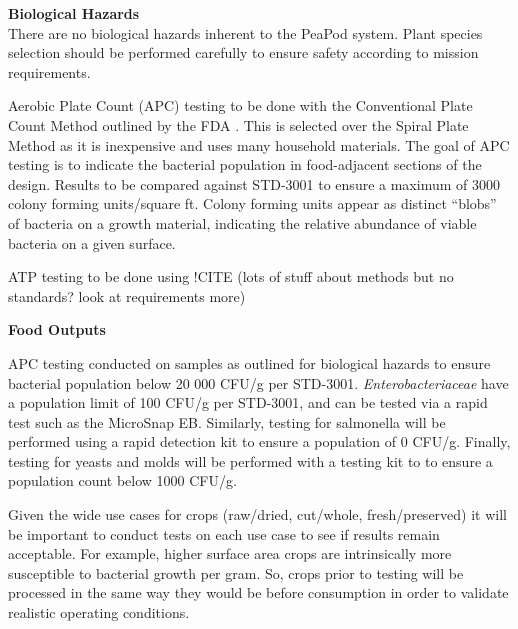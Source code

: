 
\textbf{Biological Hazards}\\
There are no biological hazards inherent to the PeaPod system. Plant species selection should be performed carefully to ensure safety according to mission requirements.

Aerobic Plate Count (APC) testing to be done with the Conventional Plate Count Method outlined by the FDA \cite{platecount}. This is selected over the Spiral Plate Method as it is inexpensive and uses many household materials. The goal of APC testing is to indicate the bacterial population in food-adjacent sections of the design. Results to be compared against STD-3001 to ensure a maximum of 3000 colony forming units/square ft. Colony forming units appear as distinct ``blobs'' of bacteria on a growth material, indicating the relative abundance of viable bacteria on a given surface.

ATP testing to be done using !CITE (lots of stuff about methods but no standards? look at requirements more)

\textbf{Food Outputs}

APC testing conducted on samples as outlined for biological hazards to ensure bacterial population below 20 000 CFU/g per STD-3001. \textit{Enterobacteriaceae} have a population limit of 100 CFU/g per STD-3001, and can be tested via a rapid test such as the MicroSnap EB. Similarly, testing for salmonella will be performed using a rapid detection kit to ensure a population of 0 CFU/g. Finally, testing for yeasts and molds will be performed with a testing kit to to ensure a population count below 1000 CFU/g.

Given the wide use cases for crops (raw/dried, cut/whole, fresh/preserved) it will be important to conduct tests on each use case to see if results remain acceptable. For example, higher surface area crops are intrinsically more susceptible to bacterial growth per gram. So, crops prior to testing will be processed in the same way they would be before consumption in order to validate realistic operating conditions.


